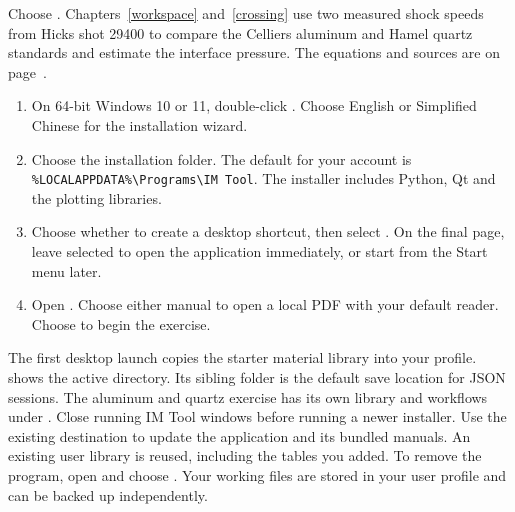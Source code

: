 \newcommand{\booktitle}{User Manual}
\newcommand{\tocname}{Contents}
\newcommand{\chapword}{Chapter \thesection}

\color{ink}
\tableofcontents
{}
Choose . Chapters~\ref{workspace} and~\ref{crossing} use two measured shock speeds from Hicks shot 29400 to compare the Celliers aluminum and Hamel quartz standards and estimate the interface pressure. The equations and sources are on page~\pageref{sources}.

\begin{enumerate}
\item On 64-bit Windows 10 or 11, double-click . Choose English or Simplified Chinese for the installation wizard.
\item Choose the installation folder. The default for your account is\\
\verb|%LOCALAPPDATA%\Programs\IM Tool|. The installer includes Python, Qt and the plotting libraries.
\item Choose whether to create a desktop shortcut, then select . On the final page, leave  selected to open the application immediately, or start  from the Start menu later.
\item Open . Choose either manual to open a local PDF with your default reader. Choose  to begin the exercise.
\end{enumerate}
The first desktop launch copies the starter material library into your profile.  shows the active  directory. Its sibling  folder is the default save location for JSON sessions. The aluminum and quartz exercise has its own library and workflows under .
Close running IM Tool windows before running a newer installer. Use the existing destination to update the application and its bundled manuals. An existing user library is reused, including the tables you added. To remove the program, open  and choose . Your working files are stored in your user profile and can be backed up independently.

